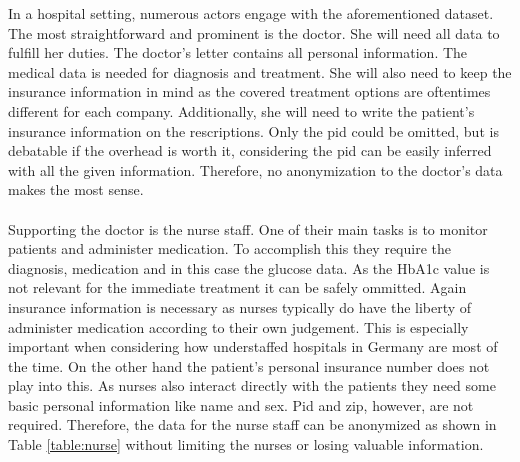 In a hospital setting, numerous actors engage with the aforementioned dataset. The most straightforward and prominent is the doctor. She will need all data to fulfill her duties. The doctor's letter contains all personal information. The medical data is needed for diagnosis and treatment. 
She will also need to keep the insurance information in mind as the covered treatment options are oftentimes different for each company. Additionally, she will need to write the patient's insurance information on the rescriptions. Only the pid could be omitted, but is debatable if the overhead is worth it, considering the pid can be easily inferred with all the given information.
Therefore, no anonymization to the doctor's data makes the most sense. \\\\
\indent Supporting the doctor is the nurse staff. One of their main tasks is to monitor patients and administer medication. To accomplish this they require the diagnosis, medication and in this case the glucose data. As the HbA1c value is not relevant for the immediate treatment it can be safely ommitted. 
Again insurance information is necessary as nurses typically do have the liberty of administer medication according to their own judgement. This is especially important when considering how understaffed hospitals in Germany are most of the time. On the other hand the patient's personal insurance number does not play into this. As nurses also interact directly with the patients they need some basic personal information like name and sex. 
Pid and zip, however, are not required. Therefore, the data for the nurse staff can be anonymized as shown in Table \ref{table:nurse} without limiting the nurses or losing valuable information. 

\bigskip

